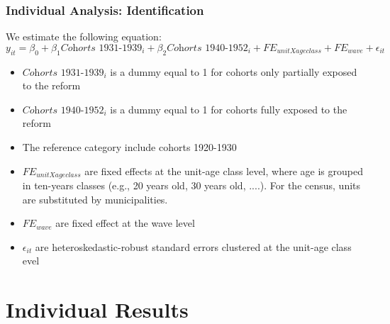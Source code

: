 \documentclass[aspectratio=169]{beamer}
\begin{document}
\begin{frame}
\frametitle{Individual Analysis: Identification}
We estimate the following equation:
    \begin{equation}\label{main_eq}
y_{it} =\beta_0+  \beta_1  \textit{Cohorts 1931-1939}_i + \beta_2 \textit{Cohorts 1940-1952}_i+FE_{unitXage class} +FE_{wave} +\epsilon_{it}
\end{equation}
    \begin{itemize}
        \item $\textit{Cohorts 1931-1939}_i$ is a dummy equal to 1 for cohorts only partially exposed to the reform 
    \medskip
    \item  $\textit{Cohorts 1940-1952}_i$ is a dummy equal to 1 for cohorts fully exposed to the reform
    \medskip
    \item The reference category include cohorts 1920-1930
    \medskip
    \item $FE_{unitXage class} $ are fixed effects at the unit-age class level, where age is grouped in ten-years classes (e.g., 20 years old, 30 years old, ....). For the census, units are substituted by municipalities.
    \medskip
    \item  $FE_{wave}$ are fixed effect at the wave level
    \medskip
    \item $\epsilon_{it}$ are heteroskedastic-robust standard errors clustered at the unit-age class  evel
    
    \end{itemize}

\end{frame}



\section{Individual Results}
\end{document}
